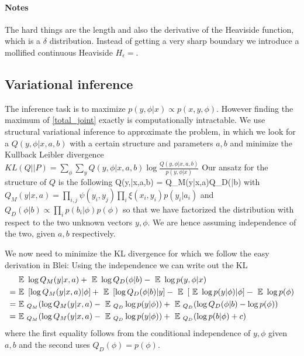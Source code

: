 \documentclass{article} %
\begin{document}
\paragraph{Notes}
The hard things are the length and also the derivative of the Heaviside function, which is a $\delta$ distribution. Instead of getting a very sharp boundary we introduce a mollified continuous Heaviside $H_{\epsilon} = $.

\subsection{Variational inference}
The inference task is to maximize $p(y,\phi|x) \propto p(x,y,\phi)$. However finding the maximum of \eqref{total_joint} exactly is computationally intractable. We use structural variational inference \cite{Jordan99_Variational, Wainwright_Variational} to approximate the problem, in which we look for a $Q(y,\phi|x,a,b)$ with a certain structure and parameters $a,b$ and minimize the Kullback Leibler divergence $KL(Q||P) = \sum_\phi \sum_y Q(y,\phi|x,a,b) \log \frac{Q(y,\phi|x,a,b)}{p(y,\phi|x)}$
Our ansatz for the structure of $Q$ is the following
\beqs
Q(y,\phi|x,a,b) = Q_M(y|x,a)Q_D(\phi|b) 
\eeqs
with $Q_M(y|x,a) = \prod_{i,j} \psi(y_i,y_j) \prod_i  \xi(x_i,y_i) p(y_i|a_i)$ and $Q_D(\phi|b) \propto \prod_i p(b_i|\phi) p(\phi)$ so that we have factorized the distribution with respect to the two unknown vectors $y, \phi$. We are hence assuming independence of the two, given $a,b$ respectively.

We now need to minimize the KL divergence for which we follow the easy derivation in Blei:
Using the independence we can write out the KL 
\begin{align*}
&\mbox{ }\mathbb{E}\mbox{ } \log Q_M(y|x,a) + \mbox{ }\mathbb{E}\mbox{ } \log Q_D(\phi|b) - \mbox{ }\mathbb{E}\mbox{ } \log p(y,\phi|x)\\
 = &\mbox{ }\mathbb{E}\mbox{ } \left[\log Q_M(y|x,a)|\phi \right] + \mbox{ }\mathbb{E}\mbox{ } \left[ \log Q_D(\phi|b) |y\right] - \mbox{ }\mathbb{E}\mbox{ } \left[\mbox{ }\mathbb{E}\mbox{ } \log p(y|\phi) |\phi \right]- \mbox{ }\mathbb{E}\mbox{ } \log p(\phi)\\
= &\mbox{ }\mathbb{E}\mbox{ }_{Q_M} (\log Q_M(y|x,a) - \mbox{ }\mathbb{E}\mbox{ }_{Q_D} \log p(y|\phi)) + \mbox{ }\mathbb{E}\mbox{ }_{Q_D} (\log Q_D(\phi|b) - \log p(\phi))\\
= &\mbox{ }\mathbb{E}\mbox{ }_{Q_M} (\log Q_M(y|x,a) - \mbox{ }\mathbb{E}\mbox{ }_{Q_D} \log p(y|\phi)) + \mbox{ }\mathbb{E}\mbox{ }_{Q_D} (\log p(b|\phi) + c)
\end{align*}
where the first equality follows from the conditional independence of $y,\phi$ given $a,b$ and the second uses $Q_D(\phi) = p(\phi)$.
\end{document}
